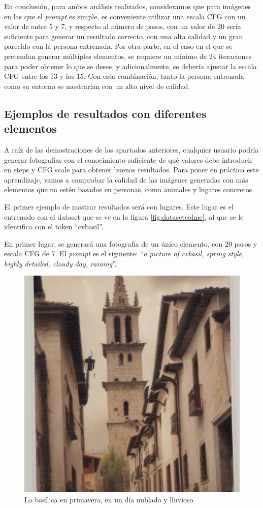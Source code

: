 En conclusión, para ambos análisis realizados, consideramos que para imágenes en las que el \textit{prompt} es simple, es conveniente utilizar una escala CFG con un valor de entre 5 y 7, y respecto al número de pasos, con un valor de 20 sería suficiente para generar un resultado correcto, con una alta calidad y un gran parecido con la persona entrenada. Por otra parte, en el caso en el que se pretendan generar múltiples elementos, se requiere un mínimo de 24 iteraciones para poder obtener lo que se desee, y adicionalmente, se debería ajustar la escala CFG entre los 13 y los 15. Con esta combinación, tanto la persona entrenada como su entorno se mostrarían con un alto nivel de calidad.

\subsection{Ejemplos de resultados con diferentes elementos}


A raíz de las demostraciones de los apartados anteriores, cualquier usuario podría generar fotografías con el conocimiento suficiente de qué valores debe introducir en steps y CFG scale para obtener buenos resultados. Para poner en práctica este aprendizaje, vamos a comprobar la calidad de las imágenes generadas con más elementos que no estén basados en personas, como animales y lugares concretos.

El primer ejemplo de mostrar resultados será con lugares. Este lugar es el entrenado con el dataset que se ve en la figura \ref{fig:datasetcolme}, al que se le identifica con el token ``cvbasil''. 

En primer lugar, se generará una fotografía de un único elemento, con 20 pasos y escala CFG de 7. El \textit{prompt} es el siguiente: ``\textit{a picture of cvbasil, spring style, highly detailed, cloudy day, raining}''.

\begin{figure}[!htb]
	\centering
	\includegraphics[width = 0.5
	\textwidth]{Imagenes/Vectorial/colmevintage.png}
	\caption{La basílica en primavera, en un día nublado y lluvioso}
	\label{fig:cvbasilnublado}
\end{figure}
 

